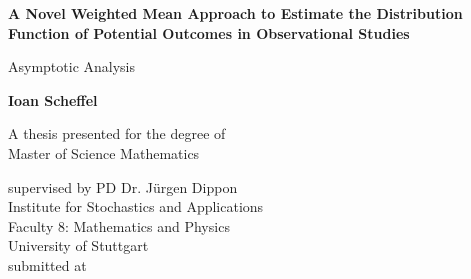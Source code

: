 \documentclass[11pt, a4paper, BCOR=7mm, DIV=11]{scrbook}
\theoremstyle{definition}
\theoremstyle{plain}
\begin{document}
\begin{titlepage}
 \begin{center}
       \vspace*{1cm}
       \textbf{
    A Novel Weighted Mean Approach to Estimate the Distribution Function of Potential Outcomes in Observational Studies 
  }

       \vspace{0.5cm}
       Asymptotic Analysis
            
       \vspace{1.5cm}

       \textbf{Ioan Scheffel}

       \vfill
            
       A thesis presented for the degree of\\
       Master of Science Mathematics
            
       \vspace{0.8cm}
     
      
       supervised by PD Dr. Jürgen Dippon
       \\
            Institute for Stochastics and Applications
            \\
       Faculty 8: Mathematics and Physics
       \\
University of Stuttgart
\\
submitted at 
   \end{center}
\end{titlepage}
\cleardoublepage
\frontmatter
\end{document}
